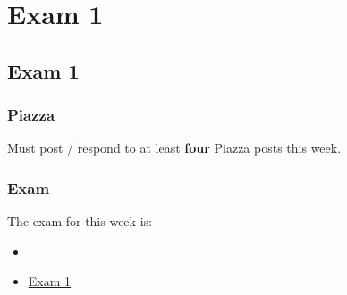 \clearpage

\renewcommand{\ChapTitle}{Exam 1}
\renewcommand{\SectionTitle}{Exam 1}

\chapter{\ChapTitle}
\section{\SectionTitle}

\subsection{Piazza}

Must post / respond to at least \textbf{four} Piazza posts this week.  

\subsection{Exam}

The exam for this week is: 

\begin{itemize}
    \item {}
    \item \href{https://applied.cs.colorado.edu/mod/quiz/view.php?id=50729}{Exam 1}  
\end{itemize}
